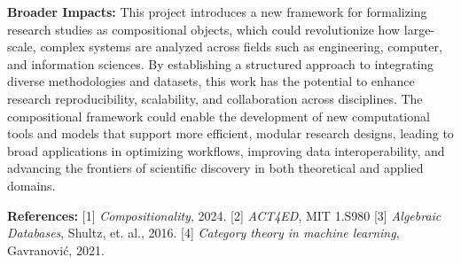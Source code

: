 \documentclass[11pt]{extarticle}
\begin{document}
\textbf{Broader Impacts:} This project introduces a new framework for formalizing research studies as compositional objects, which could revolutionize how large-scale, complex systems are analyzed across fields such as engineering, computer, and information sciences. By establishing a structured approach to integrating diverse methodologies and datasets, this work has the potential to enhance research reproducibility, scalability, and collaboration across disciplines. The compositional framework could enable the development of new computational tools and models that support more efficient, modular research designs, leading to broad applications in optimizing workflows, improving data interoperability, and advancing the frontiers of scientific discovery in both theoretical and applied domains.

\textbf{References:} [1] \textit{Compositionality}, 2024. [2] \textit{ACT4ED}, MIT 1.S980 [3] \textit{Algebraic Databases}, Shultz, et. al., 2016. [4] \textit{Category theory in machine learning}, Gavranović, 2021.
\end{document}
